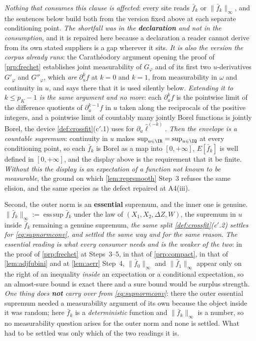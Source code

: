 \emph{Nothing that consumes this clause is affected}: every site reads $\bar f_k$ or
$\|\bar f_k\|_\infty$, and the sentences below build both from the version fixed above at each separate
conditioning point. \emph{The shortfall was in the \textbf{declaration} and not in the consumption}, and it is
repaired here because a declaration a reader cannot derive from its own stated suppliers is a gap
wherever it sits. \emph{It is also
the version the corpus already runs}: the Carath\'eodory argument opening the proof of \cref{prp:frechet}
establishes joint measurability of $G_\varphi$ and of its first two $u$-derivatives $G'_\varphi$ and
$G''_\varphi$, which \emph{are} $\partial_u^{k}f$ at $k=0$ and $k=1$, from measurability in $\omega$ and
continuity in $u$, and says there that it is used silently below. \emph{Extending it to $k\le p_K-1$ is the same argument and no more}: each $\partial_u^{k}f$ is the
pointwise limit of the difference quotients of $\partial_u^{k-1}f$ in $u$ taken along the reciprocals of the
positive integers, and a pointwise limit of countably many jointly Borel functions is jointly Borel, the
device \cref{def:crossfit}\textup{(c$'$.1)} uses for $\partial_u\hat\ell^{(-k)}$. \emph{Then the envelope is a
countable supremum}: continuity in $u$ makes $\sup_{u\in\IR}=\sup_{u\in\IQ}$ at every conditioning point, so
each $\bar f_k$ is Borel as a map into $[0,+\infty]$, $E[\bar f_k]$ is well defined in $[0,+\infty]$, and the
display above is the requirement that it be finite. \emph{Without this the display is an expectation of a
function not known to be measurable}, the ground on which \cref{lem:reprsmooth} Step~3 refuses the same
elision, and the same species as the defect repaired at A4(iii).

Second, the outer norm is an \textbf{essential} supremum, and the inner one is genuine.
$\|\bar f_k\|_\infty:=\operatorname{ess\,sup}\bar f_k$ under the law of $(X_1,X_2,\Delta Z,W)$, the supremum
in $u$ inside $\bar f_k$ remaining a genuine supremum, \emph{the same split
\cref{def:crossfit}\textup{(c$'$.2)} settles for \eqref{eq:supnormconv}, and settled the same way and for the
same reason}. \emph{The essential reading is what every consumer needs and is the weaker of the two}: in the
proof of \cref{prp:frechet} at Steps~3--5, in that of \cref{prp:compact}, in that of \cref{lem:adjfubini} and
at \cref{lem:aerr} Step~4,
$\|\bar f_0\|_\infty$ and $\|\bar f_1\|_\infty$ appear only on the right of an inequality \emph{inside} an
expectation or a conditional expectation, so an almost-sure bound is exact there and a sure bound would be
surplus strength. \emph{One thing does \textbf{not} carry over from \eqref{eq:supnormconv}}: there the outer
essential supremum needed a measurability argument of its own because the object inside it was random; here
$\bar f_k$ is a \emph{deterministic} function and $\|\bar f_k\|_\infty$ is a number, so no measurability
question arises for the outer norm and none is settled. What had to be settled was only which of the two
readings it is.

